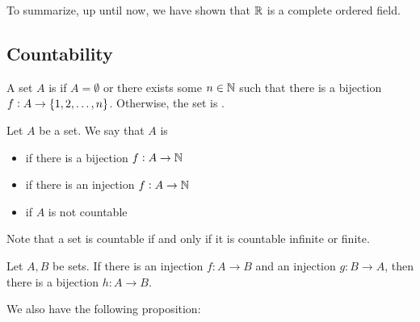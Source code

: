 \documentclass{styles/tufte}
\begin{document}
      To summarize, up until now, we have shown that $\mathbb{R}$ is a complete ordered field.
  
  
  \subsection{Countability}
    
    \begin{definition}{}{}
      A set $A$ is  if $A = \emptyset$ or there exists some $n \in \mathbb{N}$ such that there is a bijection $f : A \to \set{1, 2, \dots, n}$. Otherwise, the set is .
    \end{definition}
    
    \begin{definition}{}{}
      Let $A$ be a set. We say that $A$ is
      \begin{itemize}
        \item {} if there is a bijection $f : A \to \mathbb{N}$
        \item {} if there is an injection $f : A \to \mathbb{N}$
        \item {} if $A$ is not countable
      \end{itemize}
    \end{definition}
    
    Note that a set is countable if and only if it is countable infinite or finite.
    
    \begin{proposition}{}{}
      Let $A, B$ be sets. If there is an injection $f : A \to B$ and an injection $g : B \to A$, then there is a bijection $h : A \to B$.
    \end{proposition}
    
    We also have the following proposition:
    
\end{document}
